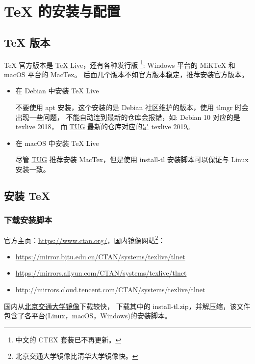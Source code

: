 \chapter{{\TeX} 的安装与配置}

\section{{\TeX} 版本}

{\TeX} 官方版本是 \href{http://www.tug.org/texlive}{{\TeX} Live}，还有各种发行版
\footnote{中文的 CTEX 套装已不再更新。}: Windows 平台的 MiKTeX 和 macOS 平台的 MacTex。 
后面几个版本不如官方版本稳定，推荐安装官方版本。

\begin{itemize}
\item{在 Debian 中安装 {\TeX} Live}

不要使用 apt 安装，这个安装的是 Debian 社区维护的版本，使用 tlmgr 时会出现一些问题，
不能自动连到最新的仓库会报错，如: Debian 10 对应的是 texlive 2018，
而 \href{https://tug.org/}{TUG} 最新的仓库对应的是 texlive 2019。

\item{在 macOS 中安装 {\TeX} Live}

尽管 \href{https://tug.org/}{TUG} 推荐安装 MacTex，但是使用 install-tl 安装脚本可以保证与 Linux 安装一致。
\end{itemize}

\section{安装 {\TeX}}

\subsection{下载安装脚本}

官方主页：\url{https://www.ctan.org/}，国内镜像网站\footnote{北京交通大学镜像比清华大学镜像快。}：

\begin{itemize}
\item \url{https://mirror.bjtu.edu.cn/CTAN/systems/texlive/tlnet}
\item \url{https://mirrors.aliyun.com/CTAN/systems/texlive/tlnet}
\item \url{http://mirrors.cloud.tencent.com/CTAN/systems/texlive/tlnet}
\end{itemize}

国内从\href{https://mirror.bjtu.edu.cn/CTAN/systems/texlive/tlnet}{北京交通大学镜像}下载较快，
下载其中的 install-tl.zip，并解压缩，该文件包含了各平台(Linux，macOS，Windows)的安装脚本。

